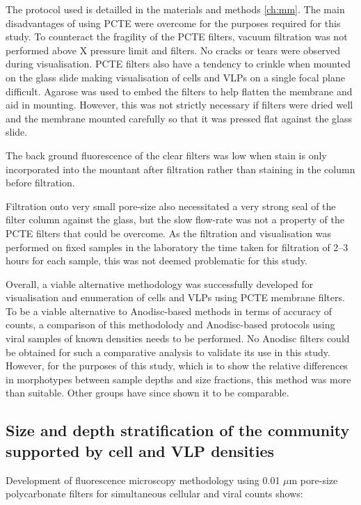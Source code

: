 The protocol used is detailled in the materials and methods \ref{ch:mm}.
The main disadvantages of using \ac{PCTE} were overcome for the purposes required for this study.
To counteract the fragility of the \ac{PCTE} filters, vacuum filtration was not performed above X pressure limit and filters.
No cracks or tears were observed during visualisation.
\ac{PCTE} filters also have a tendency to crinkle when mounted on the glass slide making visualisation of cells and \acp{VLP} on a single focal plane difficult.
Agarose was used to embed the filters to help flatten the membrane and aid in mounting.
However, this was not strictly necessary if filters were dried well and the membrane mounted carefully so that it was pressed flat against the glass slide.

The back ground fluorescence of the clear filters was low when stain is only incorporated into the mountant after filtration rather than staining in the column before filtration.

Filtration onto very small pore-size also necessitated a very strong seal of the filter column against the glass, but the slow flow-rate was not a property of the \ac{PCTE} filters that could be overcome.
As the filtration and visualisation was performed on fixed samples in the laboratory the time taken for filtration of 2--3 hours for each sample, this was not deemed problematic for this study.

Overall, a viable alternative methodology was successfully developed for visualisation and enumeration of cells and \acp{VLP} using \ac{PCTE} membrane filters.
To be a viable alternative to Anodisc-based methods in terms of accuracy of counts, a comparison of this methodolody and Anodisc-based protocols using viral samples of known densities needs to be performed.
No Anodisc filters could be obtained for such a comparative analysis to validate its use in this study.
However, for the purposes of this study, which is to show the relative differences in morphotypes between sample depths and size fractions, this method was more than suitable.
Other groups have since shown it to be comparable. %


\subsection[Community stratification supported by cell and VLP densities]{Size and depth stratification of the community supported by cell and \ac{VLP} densities}
Development of fluorescence microscopy methodology using 0.01 $\mu$m pore-size polycarbonate filters for simultaneous cellular and viral counts shows:

